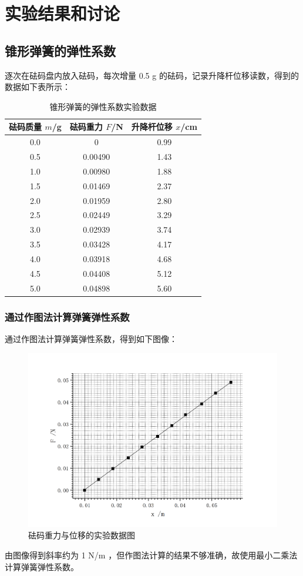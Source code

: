 \documentclass[a4paper]{extarticle}
\begin{document}
    \section{实验结果和讨论}
    \subsection{锥形弹簧的弹性系数}
    \hspace{2em}
    逐次在砝码盘内放入砝码，每次增量 0.5 g 的砝码，记录升降杆位移读数，得到的数据如下表所示：
    \begin{table}[H]
        \centering
        \caption{锥形弹簧的弹性系数实验数据}
        \begin{tabular}{ccc}
            \toprule
            砝码质量 $m$/g & 砝码重力 $F$/N & 升降杆位移 $x$/cm\\
            \midrule
            0.0 & 0 & 0.99\\
            0.5 & 0.00490 & 1.43\\
            1.0 & 0.00980 & 1.88\\
            1.5 & 0.01469 & 2.37\\
            2.0 & 0.01959 & 2.80\\
            2.5 & 0.02449 & 3.29\\
            3.0 & 0.02939 & 3.74\\
            3.5 & 0.03428 & 4.17\\
            4.0 & 0.03918 & 4.68\\
            4.5 & 0.04408 & 5.12\\
            5.0 & 0.04898 & 5.60\\
            \bottomrule
        \end{tabular}
    \end{table}
    \subsubsection{通过作图法计算弹簧弹性系数}
    \hspace{2em}
    通过作图法计算弹簧弹性系数，得到如下图像：
    \begin{figure}[H]
        \centering
        \includegraphics[width=0.8\linewidth]{sb.png}
        \caption{砝码重力与位移的实验数据图}
    \end{figure}
    由图像得到斜率约为 1 N/m ，但作图法计算的结果不够准确，故使用最小二乘法计算弹簧弹性系数。
\end{document}
